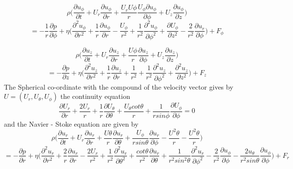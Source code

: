 \documentclass[a4paper, 12pt]{report}
\begin{document}
\begin{equation*} 
	\rho\bigg(\frac{\partial u_\phi}{\partial t}+U_r\frac{\partial u_\phi}{\partial r}+\frac{U_rU\phi}{r}\frac{U_\phi\partial u_\phi}{\partial \phi}+U_z\frac{\partial u_\phi}{\partial z}\bigg)
\end{equation*}
\begin{equation*} 
	=-\frac{1}{r}\frac{\partial p}{\partial \phi}+\eta\bigg(\frac{\partial^2 u_\phi}{\partial r^2}+\frac{1}{r}\frac{\partial u_\phi}{\partial r}-\frac{U_\phi}{r^2}+\frac{1}{r^2}\frac{\partial^2 u_\phi}{\partial \phi^2}+\frac{\partial U_\phi}{\partial z^2}-\frac{2}{r^2}\frac{\partial u_r}{\partial \phi}\bigg)+F_\phi
\end{equation*}

\begin{equation*} 
	\rho\bigg(\frac{\partial u_z}{\partial t}+U_r\frac{\partial u_z}{\partial r}+\frac{U\phi}{r}\frac{\partial u_z}{\partial \phi}+U_z\frac{\partial u_z}{\partial z}\bigg)
\end{equation*}
\begin{equation*} 
	=-\frac{\partial p}{\partial z}+\eta\bigg(\frac{\partial^2 u_z}{\partial r^2}+\frac{1}{r}\frac{\partial u_z}{\partial r}+\frac{1}{r^2}+\frac{1}{r^2}\frac{\partial^2 u_z}{\partial \phi^2}+\frac{\partial^2 u_z}{\partial z^2}\bigg)+F_z
\end{equation*}
The Spherical co-ordinate with the compound of the velocity vector gives by $U=(U_r,U_\theta,U_\phi)$ the continuity equation
\begin{equation*}
	\frac{\partial U_r}{\partial r}+\frac{2U_r}{r}+\frac{1}{r}\frac{\partial U_\theta}{\partial \theta}+\frac{U_\theta cot\theta}{r}+\frac{1}{rsin\phi}\frac{\partial U_\phi}{\partial \phi}=0
\end{equation*}
and the Navier - Stoke equation are given by 
\begin{equation*} 
	\rho\bigg(\frac{\partial u_r}{\partial t}+U_r\frac{\partial u_r}{\partial r}+\frac{U\theta}{r}\frac{\partial u_r}{\partial \theta}+\frac{U_\phi}{rsin\theta}\frac{\partial u_r}{\partial \phi}-\frac{U^2\theta}{r}-\frac{U^2\theta}{r}\bigg)
\end{equation*}
\begin{equation*} 
	=-\frac{\partial p}{\partial r}+\eta\bigg(\frac{\partial^2 u_r}{\partial r^2}+\frac{2}{r}\frac{\partial u_r}{\partial r}-\frac{2U_r}{r^2}+\frac{1}{r^2}\frac{\partial^2 u_r}{\partial \theta^2}+\frac{cot\theta}{r^2}\frac{\partial u_r}{\partial \theta}+\frac{1}{r^2sin^2\theta}\frac{\partial^2 u_r}{\partial \phi^2}-\frac{2}{r^2}\frac{\partial u_\phi}{\partial \phi}-\frac{2u_\theta}{r^2sin\theta}\frac{\partial u_\phi}{\partial\phi}\bigg)+F_r
\end{equation*}
\end{document}
